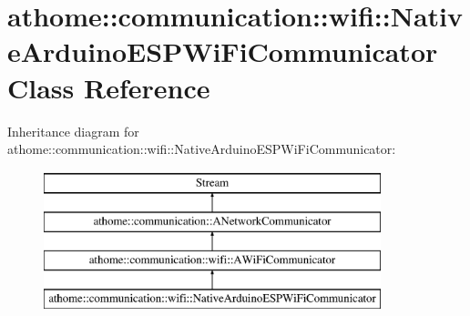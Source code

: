 \hypertarget{classathome_1_1communication_1_1wifi_1_1_native_arduino_e_s_p_wi_fi_communicator}{}\section{athome\+:\+:communication\+:\+:wifi\+:\+:Native\+Arduino\+E\+S\+P\+Wi\+Fi\+Communicator Class Reference}
\label{classathome_1_1communication_1_1wifi_1_1_native_arduino_e_s_p_wi_fi_communicator}
Inheritance diagram for athome\+:\+:communication\+:\+:wifi\+:\+:Native\+Arduino\+E\+S\+P\+Wi\+Fi\+Communicator\+:\begin{figure}[H]
\begin{center}
\leavevmode
\includegraphics[height=4.000000cm]{classathome_1_1communication_1_1wifi_1_1_native_arduino_e_s_p_wi_fi_communicator}
\end{center}
\end{figure}
